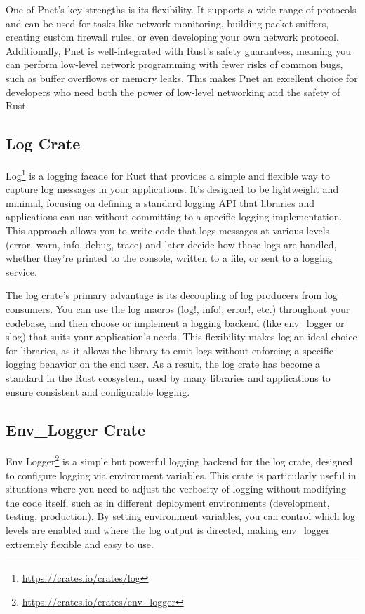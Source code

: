 One of Pnet's key strengths is its flexibility. It supports a wide range of protocols and can be used for tasks like network monitoring, building packet sniffers, creating custom firewall rules, or even developing your own network protocol. Additionally, Pnet is well-integrated with Rust’s safety guarantees, meaning you can perform low-level network programming with fewer risks of common bugs, such as buffer overflows or memory leaks. This makes Pnet an excellent choice for developers who need both the power of low-level networking and the safety of Rust.

\subsection{Log Crate}

Log\footnote{\url{https://crates.io/crates/log}} is a logging facade for Rust that provides a simple and flexible way to capture log messages in your applications. It’s designed to be lightweight and minimal, focusing on defining a standard logging API that libraries and applications can use without committing to a specific logging implementation. This approach allows you to write code that logs messages at various levels (error, warn, info, debug, trace) and later decide how those logs are handled, whether they're printed to the console, written to a file, or sent to a logging service.

The log crate’s primary advantage is its decoupling of log producers from log consumers. You can use the log macros (log!, info!, error!, etc.) throughout your codebase, and then choose or implement a logging backend (like env\_logger or slog) that suits your application's needs. This flexibility makes log an ideal choice for libraries, as it allows the library to emit logs without enforcing a specific logging behavior on the end user. As a result, the log crate has become a standard in the Rust ecosystem, used by many libraries and applications to ensure consistent and configurable logging.

\subsection{Env\_Logger Crate}

Env Logger\footnote{\url{https://crates.io/crates/env_logger}} is a simple but powerful logging backend for the log crate, designed to configure logging via environment variables. This crate is particularly useful in situations where you need to adjust the verbosity of logging without modifying the code itself, such as in different deployment environments (development, testing, production). By setting environment variables, you can control which log levels are enabled and where the log output is directed, making env\_logger extremely flexible and easy to use.

